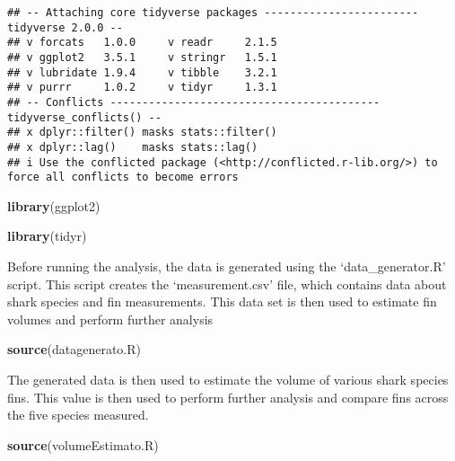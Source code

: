 \documentclass[
]{article}
\newenvironment{Shaded}{\begin{snugshade}}{\end{snugshade}}
\newcommand{\FunctionTok}[1]{\textcolor[rgb]{0.13,0.29,0.53}{\textbf{#1}}}
\newcommand{\NormalTok}[1]{#1}
\newcommand{\StringTok}[1]{\textcolor[rgb]{0.31,0.60,0.02}{#1}}
\begin{document}
\begin{verbatim}
## -- Attaching core tidyverse packages ------------------------ tidyverse 2.0.0 --
## v forcats   1.0.0     v readr     2.1.5
## v ggplot2   3.5.1     v stringr   1.5.1
## v lubridate 1.9.4     v tibble    3.2.1
## v purrr     1.0.2     v tidyr     1.3.1
## -- Conflicts ------------------------------------------ tidyverse_conflicts() --
## x dplyr::filter() masks stats::filter()
## x dplyr::lag()    masks stats::lag()
## i Use the conflicted package (<http://conflicted.r-lib.org/>) to force all conflicts to become errors
\end{verbatim}

\begin{Shaded}
\begin{Highlighting}[]
\FunctionTok{library}\NormalTok{(ggplot2)}
\end{Highlighting}
\end{Shaded}

\begin{Shaded}
\begin{Highlighting}[]
\FunctionTok{library}\NormalTok{(tidyr)}
\end{Highlighting}
\end{Shaded}

Before running the analysis, the data is generated using the
`data\_generator.R' script. This script creates the `measurement.csv'
file, which contains data about shark species and fin measurements. This
data set is then used to estimate fin volumes and perform further
analysis

\begin{Shaded}
\begin{Highlighting}[]
\FunctionTok{source}\NormalTok{(}\StringTok{\textquotesingle{}datagenerato.R\textquotesingle{}}\NormalTok{)}
\end{Highlighting}
\end{Shaded}

The generated data is then used to estimate the volume of various shark
species fins. This value is then used to perform further analysis and
compare fins across the five species measured.

\begin{Shaded}
\begin{Highlighting}[]
\FunctionTok{source}\NormalTok{(}\StringTok{\textquotesingle{}volumeEstimato.R\textquotesingle{}}\NormalTok{)}
\end{Highlighting}
\end{Shaded}
\end{document}
